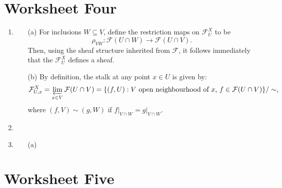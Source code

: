 \documentclass[a4paper]{report}
\theoremstyle{definition}
\theoremstyle{remark}
\theoremstyle{proposition}
\theoremstyle{conjecture}
\theoremstyle{lemma}
\theoremstyle{corollary}
\theoremstyle{exercise}
\theoremstyle{example}
\newcommand{\mcal}{\mathcal}
\begin{document}
\section{Worksheet Four}

\begin{enumerate}
    \item 
        \begin{itemize}
            \item[(a)] For inclusions $W\subseteq V$, define the restriction 
                maps on $\mcal{F}_U^X$ to be 
                $$\rho_{VW} : \mcal{F}(U\cap W) \longrightarrow \mcal{F}(U\cap V).$$
                Then, using the sheaf structure inherited from $\mcal{F}$,
                it follows immediately that the $\mcal{F}_U^X$ defines
                a sheaf.
            \item[(b)] By definition, the stalk at any point $x\in U$
                is given by:
                $$\mcal{F}^X_{U,x} = \varprojlim_{x \in V} \mcal{F}(U\cap V) = \lbrace (f,U) :  \text{$V$ open neighbourhood of $x$, $f\in\mcal{F}(U\cap V)$}\rbrace/\sim,$$
                where $(f,V) \sim (g,W)$ if 
                $f\vert_{V \cap W} = g\vert_{V\cap W}$.
        \end{itemize}
    \item
    \item
        \begin{itemize}
            \item[(a)]
        \end{itemize}
\end{enumerate}

\section{Worksheet Five}
\end{document}

